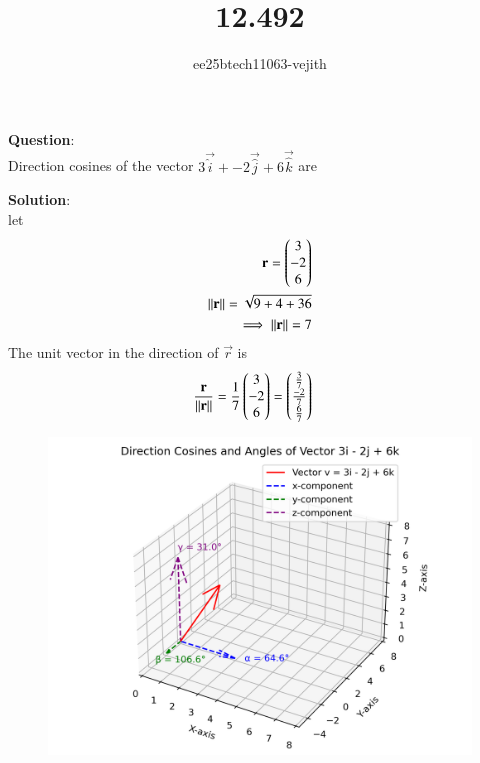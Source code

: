 \documentclass[journal]{IEEEtran}
\begin{document}

\vspace{3cm}

\title{12.492}
\author{ee25btech11063-vejith}

\maketitle
{\let\newpage\relax\maketitle}
\renewcommand{\thefigure}{\theenumi}
\renewcommand{\thetable}{\theenumi}
\setlength{\intextsep}{10pt} %
\textbf{Question}:\\
Direction cosines of the vector $3\vec{\hat{i}} + -2\vec{\hat{j}} + 6\vec{\hat{k}}$ are
\begin{enumerate}[label=\alph*)]
    \begin{multicols}{2}
        \item {}
        \item {}
       \item {}
        \item {}
    \end{multicols}
\end{enumerate}
\textbf{Solution}:\\
let 
\begin{align}
    \Vec{r} = \myvec{3\\-2\\6}\\
    \norm{\vec{r}}=\sqrt{9 +4 +36}\\
\implies \norm{\vec{r}}=7
\end{align}
The unit  vector in the direction of $\vec{r}$  is
\begin{align}
    \frac{\mathbf{r}}{\left\lVert\mathbf{r}\right\rVert} &= \frac{1}{7}\begin{pmatrix}3\\-2\\6\end{pmatrix} = \begin{pmatrix}\frac{3}{7}\\\frac{-2}{7}\\\frac{6}{7}\end{pmatrix}
    \end{align}

    \begin{figure}[h!]
   \centering
   \includegraphics[width=0.8\columnwidth]{figs/01.png}
   \caption{}
   \label{}
\end{figure}
\end{document}
